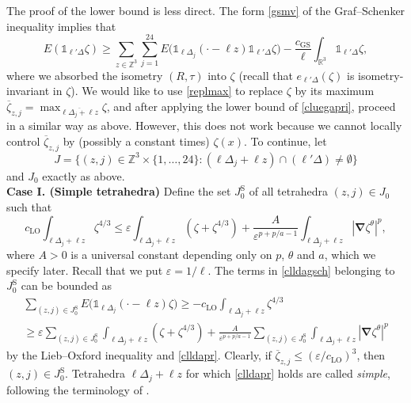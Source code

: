 \documentclass[final,onefignum,onetabnum,reqno]{amsart}
\theoremstyle{remark}
\renewcommand{\le}{\leqslant}
\renewcommand{\ge}{\geqslant}
\renewcommand{\epsilon}{\varepsilon}
\newcommand{\ol}[1]{\overline{#1}}
\newcommand{\RR}{\mathbb{R}}
\newcommand{\ZZ}{\mathbb{Z}}
\newcommand{\LO}{\mathrm{LO}} %
\newcommand{\GS}{\mathrm{GS}} %
\newcommand{\iden}{\mathbb{1}} %
\newcommand{\grad}{\bm{\nabla}} %
\newcommand{\tetra}{\mathbb{\Delta}} %
\begin{document}
The proof of the lower bound is less direct. The form \cref{gsmv} of the Graf--Schenker inequality implies that
\begin{equation}\label{clldagsch}
E(\iden_{\ell'\tetra}\zeta)\ge \sum_{z\in\ZZ^3}\sum_{j=1}^{24} E\bigl(\iden_{\ell\tetra_j}(\cdot-\ell z)\iden_{\ell'\tetra}\zeta\bigr) - \frac{c_\GS}{\ell}\int_{\RR^3}\iden_{\ell'\tetra}\zeta,
\end{equation}
where we absorbed the isometry $(R,\tau)$ into $\zeta$ (recall that $e_{\ell'\tetra}(\zeta)$ is isometry-invariant in $\zeta$). 
We would like to use \cref{replmax} to replace $\zeta$ by its maximum 
$\ol{\zeta}_{z,j}=\max_{\ol{\ell\tetra_j+\ell z}}\zeta$,
and after applying the lower bound of \cref{cluegapri}, proceed in a similar way as above. 
However, this does not work because we cannot locally control $\ol{\zeta}_{z,j}$ by (possibly a constant times) $\zeta(x)$.
To continue, let
$$
J=\{ (z,j)\in\ZZ^3\times\{1,\ldots,24\} : (\ell\tetra_j+\ell z)\cap(\ell'\tetra)\neq\emptyset \}
$$
and $J_0$ exactly as above. 
\vspace{.3em}\\
\noindent\textbf{Case I. (Simple tetrahedra)} Define the set $J_0^{\mathrm{S}}$ of all tetrahedra $(z,j)\in J_0$ such that 
\begin{equation}\label{clldapr}
c_\LO \int_{\ell\tetra_j+\ell z}\zeta^{4/3}\le \epsilon \int_{\ell\tetra_j+\ell z}\left(\zeta +\zeta^{4/3}\right) + \frac{A}{\epsilon^{p+p/a-1}} \int_{\ell\tetra_j+\ell z}|\grad\zeta^\theta|^p,
\end{equation}
where $A>0$ is a universal constant depending only on $p$, $\theta$ and $a$, which we specify later. Recall that we put $\epsilon=1/\ell$. 
The terms in \cref{clldagsch} belonging to $J_0^{\mathrm{S}}$ can be bounded as
\begin{multline*}
\sum_{(z,j)\in J_0^{\mathrm{S}}} E\bigl(\iden_{\ell\tetra_j}(\cdot-\ell z)\zeta\bigr)\ge - c_\LO \int_{\ell\tetra_j+\ell z} \zeta^{4/3}\\
\ge \epsilon \sum_{(z,j)\in J_0^{\mathrm{S}}} \int_{\ell\tetra_j+\ell z}\left(\zeta +\zeta^{4/3}\right) + \frac{A}{\epsilon^{p+p/a-1}} \sum_{(z,j)\in J_0^{\mathrm{S}}} \int_{\ell\tetra_j+\ell z}|\grad\zeta^\theta|^p
\end{multline*}
by the Lieb--Oxford inequality and \cref{clldapr}.
Clearly, if $\ol{\zeta}_{z,j}\le (\epsilon/c_\LO)^3$, then $(z,j)\in J_0^{\mathrm{S}}$. 
Tetrahedra $\ell\tetra_j+\ell z$ for which \cref{clldapr} holds are called \emph{simple}, following the terminology of \cite{jex2025classical}.
\end{document}
